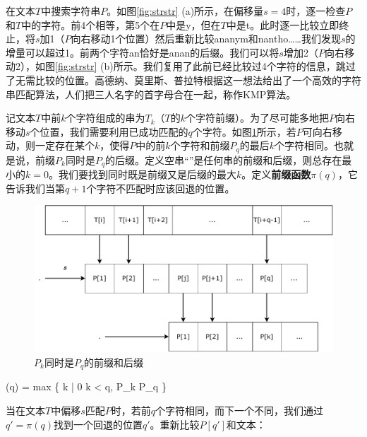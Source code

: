 \documentclass[b5paper]{ctexart}
\begin{document}
 

在文本$T$中搜索字符串$P$。如图\ref{fig:strstr} (a)所示，在偏移量$s=4$时，逐一检查$P$和$T$中的字符。前4个相等，第5个在$P$中是y，但在$T$中是t。此时逐一比较立即终止，将$s$加1（$P$向右移动1个位置）然后重新比较ananym和nantho……我们发现$s$的增量可以超过1。前两个字符an恰好是anan的后缀。我们可以将$s$增加2（$P$向右移动2），如图\ref{fig:strstr} (b)所示。我们复用了此前已经比较过4个字符的信息，跳过了无需比较的位置。高德纳、莫里斯、普拉特根据这一想法给出了一个高效的字符串匹配算法\cite{kmp}，人们把三人名字的首字母合在一起，称作KMP算法。

记文本$T$中前$k$个字符组成的串为$T_k$（$T$的$k$个字符前缀）。为了尽可能多地把$P$向右移动$s$个位置，我们需要利用已成功匹配的$q$个字符。如图\ref{fig:kmp-fallback}所示，若$P$可向右移动，则一定存在某个$k$，使得$P$中的前$k$个字符和前缀$P_q$的最后$k$个字符相同。也就是说，前缀$P_k$同时是$P_q$的后缀。定义空串“”是任何串的前缀和后缀，则总存在最小的$k=0$。我们要找到同时既是前缀又是后缀的最大$k$。定义\textbf{前缀函数}$\pi(q)$，它告诉我们当第$q+1$个字符不匹配时应该回退的位置\cite{CLRS}。

\begin{figure}[htbp]
 \centering
 \includegraphics[scale=0.5]{img/kmp-fallback}
 \caption{$P_k$同时是$P_q$的前缀和后缀}
 \label{fig:kmp-fallback}
\end{figure}

\be
\pi(q) = max \{ k | 0 \leq k < q,  P_k  P_q \}
\label{eq:prefix-function}
\ee

当在文本$T$中偏移$s$匹配$P$时，若前$q$个字符相同，而下一个不同，我们通过$q' = \pi(q)$找到一个回退的位置$q'$。重新比较$P[q']$和文本：
\end{document}
